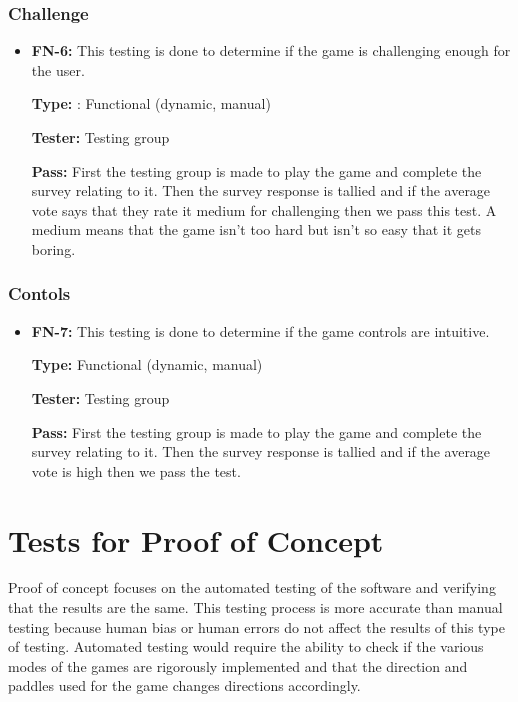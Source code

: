 \documentclass[12pt,letterpaper]{article}
\begin{document}
	\subsubsection{Challenge}
\begin{reqbox}
	\begin{itemize}

	\item \textbf{FN-6: }This testing is done to determine if the game is challenging enough for the user. 

	\textbf{Type: }: Functional (dynamic, manual)

	\textbf{Tester:  }Testing group

	\textbf{Pass: }First the testing group is made to play the game and complete the survey relating to it. Then the survey response is tallied and if the average vote says that they rate it medium for challenging then we pass this test. A medium means that the game isn’t too hard but isn’t so easy that it gets boring.

	\end{itemize}
\end{reqbox}

	\subsubsection{Contols}
\begin{reqbox}
	\begin{itemize}
	\item \textbf{FN-7: }This testing is done to determine if the game controls are intuitive.

	\textbf{Type: }Functional (dynamic, manual)
	
	\textbf{Tester:  }Testing group

	\textbf{Pass: }First the testing group is made to play the game and complete the survey relating to it. Then the survey response is tallied and if the average vote is high then we pass the test.
	\end{itemize}
\end{reqbox}


	\section{Tests for Proof of Concept}
	Proof of concept focuses on the automated testing of the software and verifying that the results are the same. This testing process is more accurate than manual testing because human bias or human errors do not affect the results of this type of testing. Automated testing would require the ability to check if the various modes of the games are rigorously implemented and that the direction and paddles used for the game changes directions accordingly.
\end{document}
